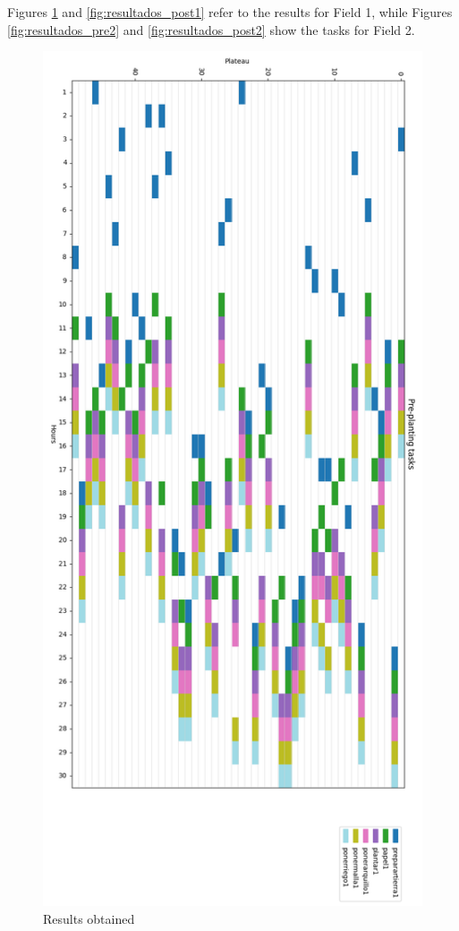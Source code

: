 Figures \ref{fig:resultados_pre1} and \ref{fig:resultados_post1} refer to the results for Field 1,  
while Figures \ref{fig:resultados_pre2} and \ref{fig:resultados_post2} show the tasks for Field 2.
\begin{figure}[ht!]
    \centering
    \includegraphics[scale=0.4]{img/grafico_pre_siembra1.png}
    \caption{Results obtained}
    \label{fig:resultados_pre1}
\end{figure}
